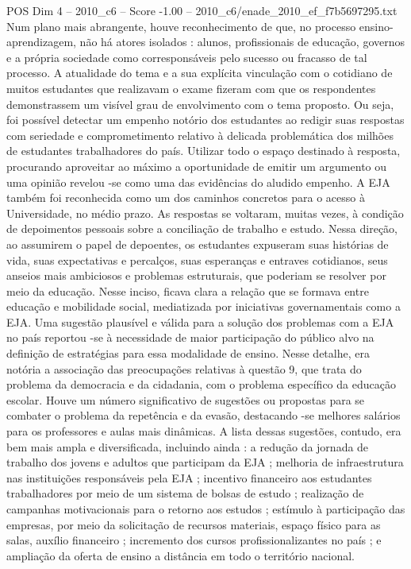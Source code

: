 \begin{textsample}{POS Dim 4 – 2010\_c6 – Score -1.00 – 2010\_c6/enade\_2010\_ef\_f7b5697295.txt}
Num plano mais abrangente, houve reconhecimento de que, no processo ensino-aprendizagem, não há atores isolados : alunos, profissionais de educação, governos e a própria sociedade como corresponsáveis pelo sucesso ou fracasso de tal processo.
A atualidade do tema e a sua explícita vinculação com o cotidiano de muitos estudantes que realizavam o exame fizeram com que os respondentes demonstrassem um visível grau de envolvimento com o tema proposto.
Ou seja, foi possível detectar um empenho notório dos estudantes ao redigir suas respostas com seriedade e comprometimento relativo à delicada problemática dos milhões de estudantes trabalhadores do país.
Utilizar todo o espaço destinado à resposta, procurando aproveitar ao máximo a oportunidade de emitir um argumento ou uma opinião revelou -se como uma das evidências do aludido empenho.
A EJA também foi reconhecida como um dos caminhos concretos para o acesso à Universidade, no médio prazo.
As respostas se voltaram, muitas vezes, à condição de depoimentos pessoais sobre a conciliação de trabalho e estudo.
Nessa direção, ao assumirem o papel de depoentes, os estudantes expuseram suas histórias de vida, suas expectativas e percalços, suas esperanças e entraves cotidianos, seus anseios mais ambiciosos e problemas estruturais, que poderiam se resolver por meio da educação.
Nesse inciso, ficava clara a relação que se formava entre educação e mobilidade social, mediatizada por iniciativas governamentais como a EJA.
Uma sugestão plausível e válida para a solução dos problemas com a EJA no país reportou -se à necessidade de maior participação do público alvo na definição de estratégias para essa modalidade de ensino.
Nesse detalhe, era notória a associação das preocupações relativas à questão 9, que trata do problema da democracia e da cidadania, com o problema específico da educação escolar.
Houve um número significativo de sugestões ou propostas para se combater o problema da repetência e da evasão, destacando -se melhores salários para os professores e aulas mais dinâmicas.
A lista dessas sugestões, contudo, era bem mais ampla e diversificada, incluindo ainda : a redução da jornada de trabalho dos jovens e adultos que participam da EJA ; melhoria de infraestrutura nas instituições responsáveis pela EJA ; incentivo financeiro aos estudantes trabalhadores por meio de um sistema de bolsas de estudo ; realização de campanhas motivacionais para o retorno aos estudos ; estímulo à participação das empresas, por meio da solicitação de recursos materiais, espaço físico para as salas, auxílio financeiro ; incremento dos cursos profissionalizantes no país ; e ampliação da oferta de ensino a distância em todo o território nacional.

\end{textsample}
